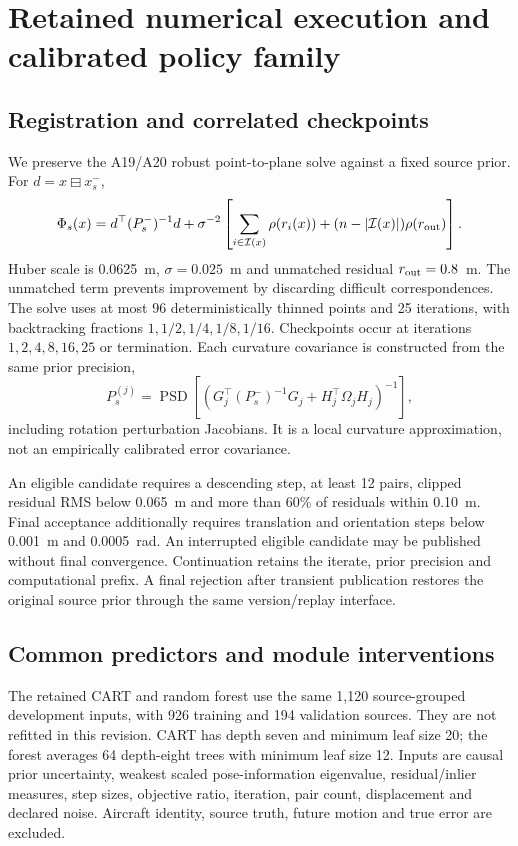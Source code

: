 \section{Retained numerical execution and calibrated policy family}\label{sec:method}
\subsection{Registration and correlated checkpoints}
We preserve the A19/A20 robust point-to-plane solve against a fixed source prior. For $d=x\boxminus x_s^-$,
\begin{equation}
\Phi_s(x)=d^\top(P_s^-)^{-1}d+\sigma^{-2}\left[\sum_{i\in\mathcal I(x)}\rho(r_i(x))+(n-|\mathcal I(x)|)\rho(r_{\rm out})\right].\label{eq:objective}
\end{equation}
Huber scale is 0.0625~m, $\sigma=0.025$~m and unmatched residual $r_{\rm out}=0.8$~m. The unmatched term prevents improvement by discarding difficult correspondences. The solve uses at most 96 deterministically thinned points and 25 iterations, with backtracking fractions $1,1/2,1/4,1/8,1/16$. Checkpoints occur at iterations $1,2,4,8,16,25$ or termination. Each curvature covariance is constructed from the same prior precision,
\begin{equation}
P_s^{(j)}=\operatorname{PSD}\left[(G_j^\top(P_s^-)^{-1}G_j+H_j^\top\Omega_jH_j)^{-1}\right],\label{eq:checkpoint-cov}
\end{equation}
including rotation perturbation Jacobians. It is a local curvature approximation, not an empirically calibrated error covariance.

An eligible candidate requires a descending step, at least 12 pairs, clipped residual RMS below 0.065~m and more than 60\% of residuals within 0.10~m. Final acceptance additionally requires translation and orientation steps below 0.001~m and 0.0005~rad. An interrupted eligible candidate may be published without final convergence. Continuation retains the iterate, prior precision and computational prefix. A final rejection after transient publication restores the original source prior through the same version/replay interface.

\subsection{Common predictors and module interventions}
The retained CART and random forest use the same 1,120 source-grouped development inputs, with 926 training and 194 validation sources. They are not refitted in this revision. CART has depth seven and minimum leaf size 20; the forest averages 64 depth-eight trees with minimum leaf size 12. Inputs are causal prior uncertainty, weakest scaled pose-information eigenvalue, residual/inlier measures, step sizes, objective ratio, iteration, pair count, displacement and declared noise. Aircraft identity, source truth, future motion and true error are excluded.

